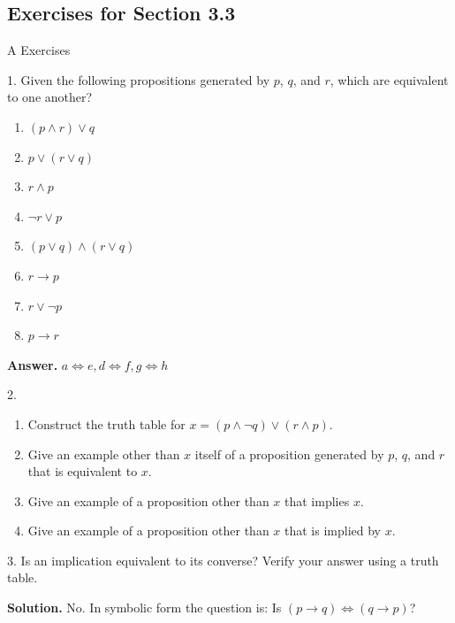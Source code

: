 \documentclass[10pt,]{book}
\theoremstyle{plain}
\theoremstyle{definition}
\theoremstyle{definition}
\theoremstyle{definition}
\theoremstyle{definition}
\begin{document}
\subsection[Exercises for Section 3.3 ]{Exercises for Section 3.3 }\label{exercises-3.3}
\hypertarget{exercisegroup-3}{}\typeout{************************************************}
\typeout{************************************************}
A Exercises%
\begin{exercisegroup}
\item[1.]\hypertarget{exercise-12}{} Given the following propositions generated by \(p\), \(q\), and \(r\), which are equivalent to one another?%
\par
\leavevmode%
\begin{enumerate}[label=\alph*]
\item\hypertarget{li-86}{}\((p \land  r) \lor  q\) %
\item\hypertarget{li-87}{}\(p\lor (r\lor q)\) %
\item\hypertarget{li-88}{}\(r \land  p\)  %
\item\hypertarget{li-89}{}\(\neg r \lor  p\) %
\item\hypertarget{li-90}{}\((p\lor q)\land (r\lor  q)\)%
\item\hypertarget{li-91}{} \(r\to  p\)%
\item\hypertarget{li-92}{} \(r \lor  \neg p\)%
\item\hypertarget{li-93}{} \(p\to r\)%
\end{enumerate}
\par\smallskip
\par\smallskip
\noindent\textbf{Answer.}\hypertarget{answer-7}{}\quad
 \(a\Leftrightarrow e, d\Leftrightarrow f, g\Leftrightarrow h\)%
\item[2.]\hypertarget{exercise-13}{}\leavevmode%
\begin{enumerate}[label=\alph*]
\item\hypertarget{li-94}{}Construct the truth table for \(x= (p \land  \neg q) \lor  (r \land  p)\).%
\item\hypertarget{li-95}{}Give an example other than \(x\) itself of a proposition generated by \(p\), \(q\), and \(r\) that is equivalent to \(x\).%
\item\hypertarget{li-96}{}Give an example of a proposition other than \(x\) that implies \(x\).%
\item\hypertarget{li-97}{} Give an example of a proposition other than \(x\) that is implied by \(x\).%
\end{enumerate}
%
\par\smallskip
\item[3.]\hypertarget{exercise-14}{}Is an implication equivalent to its converse? Verify your answer using a truth table.%
\par\smallskip
\par\smallskip
\noindent\textbf{Solution.}\hypertarget{solution-1}{}\quad
 No. In symbolic form the question is: Is \((p\to q)\Leftrightarrow (q\to p)\)?


\end{exercisegroup}
\end{document}
